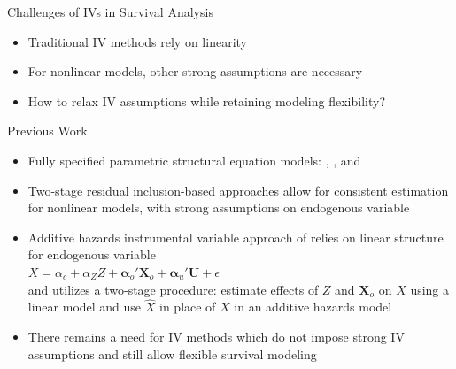\documentclass[final,plain]{beamer}
\newlength{\onecolwid}
\newcommand{\bi}{\begin{itemize}}
\newcommand{\ei}{\end{itemize}}
\newcommand{\bluebold}{\color{dblue} \bf}
\newcommand{\colfivevsep}{\vspace{23mm}}
\newcommand{\hilit}{\color{mypurple}}
\begin{document}
\begin{frame}[t]
\begin{columns}[t]
\begin{column}{\onecolwid}

  \colfivevsep %


    \begin{block}{Challenges of IVs in Survival Analysis}{
      \bi
      \itemsep18pt
      \item Traditional IV methods rely on linearity %
      \item For nonlinear models, other strong assumptions are necessary %
      \item How to relax IV assumptions while retaining modeling flexibility? %
      \ei
    }
    \end{block}

  \colfivevsep %

    \begin{block}{Previous Work }{
      \bi
      \itemsep18pt
      \item Fully specified parametric structural equation models: \citep{tang98}, \citep{muthen05}, and \citep{chen11}
      \item Two-stage residual inclusion-based approaches 
			allow for consistent estimation for nonlinear models, with strong assumptions on endogenous variable 
      \item Additive hazards instrumental variable approach of \citep{li15} relies on linear structure for endogenous variable \\
	$X = \alpha_c + \alpha_Z Z + \boldsymbol\alpha_o'\mathbf{X}_o + \boldsymbol\alpha_u'\mathbf{U} + \epsilon$ \\
	and utilizes a two-stage procedure: estimate effects of $Z$ and $\mathbf{X}_o$ on $X$ using a linear model and use $\hat{X}$ in place of $X$
	in an additive hazards model
      \item {\hilit There remains a need for IV methods which do not impose strong IV assumptions and still allow flexible survival modeling}
      \ei
    }
    \end{block}


\end{column}
\end{columns}
\end{frame}
\end{document}
